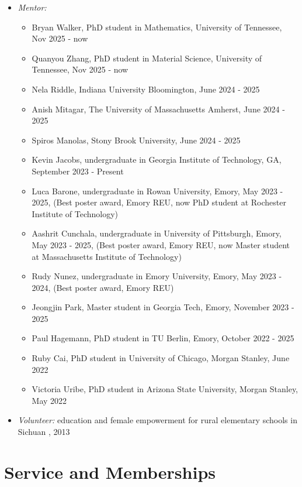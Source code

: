 \documentclass[11pt,a4paper,roman]{moderncv}
\begin{document}
\begin{itemize}
\begin{itemize}
\item Statistics for Economics (Fall 2016)
\end{itemize}
\vspace{1pt}

\item \emph{Mentor:}
\begin{itemize}
\item Bryan Walker, PhD student in Mathematics, University of Tennessee, Nov 2025 - now
\item Quanyou Zhang, PhD student in Material Science, University of Tennessee, Nov 2025 - now
\item Nela Riddle, Indiana University Bloomington, June 2024 - 2025
\item Anish Mitagar, The University of Massachusetts Amherst, June 2024 - 2025
\item Spiros Manolas, Stony Brook University, June 2024 - 2025
\item Kevin Jacobs, undergraduate in Georgia Institute of Technology, GA, September 2023 - Present
\item Luca Barone, undergraduate in Rowan University, Emory, May 2023 - 2025, (Best poster award, Emory REU, now PhD student at Rochester Institute of Technology)
\item Aashrit Cunchala, undergraduate in University of Pittsburgh, Emory, May 2023 - 2025, (Best poster award, Emory REU, now Master student at Massachusetts Institute of Technology)
\item Rudy Nunez, undergraduate in Emory University, Emory, May 2023 - 2024, (Best poster award, Emory REU)
\item Jeongjin Park, Master student in Georgia Tech, Emory, November 2023 - 2025 
\item Paul Hagemann, PhD student in TU Berlin, Emory, October 2022 - 2025 
\item  Ruby Cai, PhD student in University of Chicago, Morgan Stanley, June 2022 
    \item Victoria Uribe, PhD student in Arizona State University, Morgan Stanley, May 2022 
\end{itemize}

\item \emph{Volunteer:} education and female empowerment for rural elementary schools in Sichuan , 2013
\end{itemize}

\section{Service and Memberships}
\end{document}
